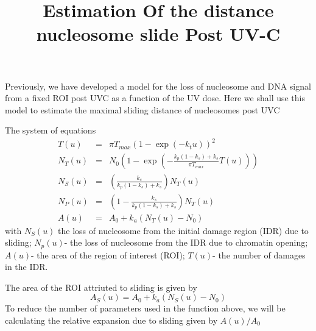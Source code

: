 \documentclass[12pt]{report}
\begin{document}
	\title{Estimation Of the distance nucleosome slide Post UV-C}
	\maketitle
	Previously, we have developed a model for the loss of nucleosome and DNA signal from a fixed ROI post UVC as a function of the UV dose. Here we shall use this model to estimate the maximal sliding distance of nucleosomes post UVC
	
	The system of equations 
	\begin{eqnarray}
	T(u)   &=& \pi T_{max}(1-\exp(-k_tu))^2\\
	N_T(u) &=& N_0\left(1-\exp(-\frac{k_p(1-k_s)+k_s}{\pi T_{max}}T(u))\right)\\
	N_S(u) &=& \left(\frac{k_s}{k_p(1-k_s)+k_s}\right)N_T(u)\\
	N_P(u) &=& \left(1-\frac{k_s}{k_p(1-k_s)+k_s}\right)N_T(u)\\
	A(u)   &=& A_0 +k_a(N_T(u)-N_0)
	\end{eqnarray}
	with $N_S(u)$ the loss of nucleosome from the initial damage region (IDR) due to sliding; $N_p(u)$- the loss of nucleosome from the IDR due to chromatin opening; $A(u)$- the area of the region of interest (ROI); $T(u)$- the number of damages in the IDR. 
	
	The area of the ROI attriuted to sliding is given by 
	\begin{equation}
	A_S(u) = A_0+k_a(N_S(u)-N_0)
	\end{equation}
	To reduce the number of parameters used in the function above, we will be calculating the relative expansion due to sliding given by $A(u)/A_0$ 
	
	
\end{document}
